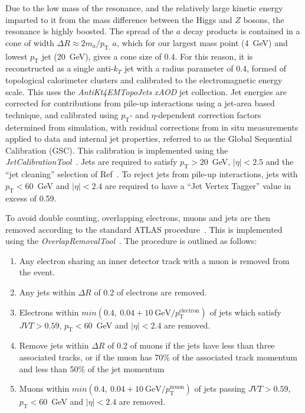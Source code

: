 \documentclass[NOTE, atlasdraft=true, texlive=2017, UKenglish]{\ATLASLATEXPATH atlasdoc}
\begin{document}
Due to the low mass of the resonance, and the relatively large kinetic energy imparted to it from the mass difference between the Higgs and $Z$ bosons, the resonance is highly boosted. The spread of the $a$ decay products is contained in a cone of width $\Delta R \approx 2 m_{a}/p_\text{T, }a$, which for our largest mass point (4~GeV) and lowest $p_\text{T}$ jet (20~GeV), gives a cone size of 0.4. For this reason, it is reconstructed as a single anti-$k_T$ jet with a radius parameter of 0.4, formed of topological calorimeter clusters and calibrated to the electromagnetic energy scale. This uses the \emph{AntiKt4EMTopoJets} \emph{xAOD} jet collection. Jet energies are corrected for contributions from pile-up interactions using a jet-area based technique, and calibrated using $p_\text{T}$- and $\eta$-dependent correction factors determined from simulation, with residual corrections from in situ measurements applied to data and internal jet properties, referred to as the Global Sequential Calibration (GSC). This calibration is implemented using the \emph{JetCalibrationTool}~\cite{JetCalibrationTool}. Jets are required to satisfy $p_\text{T}>20$~GeV, $\vert\eta\vert<2.5$ and the ``jet cleaning'' selection of Ref~\cite{ATLAS-CONF-2015-029}. To reject jets from pile-up interactions, jets with $p_\text{T}<60$~GeV and $\vert\eta\vert<2.4$ are required to have a ``Jet Vertex Tagger'' value in excess of 0.59.%


To avoid double counting, overlapping electrons, muons and jets are then removed according to the standard ATLAS procedure~\cite{Masubuchi:2235437}. This is implemented using the \emph{OverlapRemovalTool}~\cite{Adams:1743654}. The procedure is outlined as follows:
\begin{enumerate}
\item Any electron sharing an inner detector track with a muon is removed from the event.
\item Any jets within $\Delta R$ of 0.2 of electrons are removed.
\item Electrons within $min(0.4,\ 0.04 + 10\ \text{GeV}/p_\text{T}^\text{electron})$ of jets which satisfy $JVT > 0.59$, $p_\text{T}<60$~GeV and $\vert\eta\vert<2.4$ are removed.
\item Remove jets within $\Delta R$ of 0.2 of muons if the jets have less than three associated tracks, or if the muon has 70\% of the associated track momentum and less than 50\% of the jet momentum
\item Muons within $min(0.4,\ 0.04 + 10\ \text{GeV}/p_\text{T}^\text{muon})$ of jets passing $JVT > 0.59$, $p_\text{T}<60$~GeV and $\vert\eta\vert<2.4$ are removed.
\end{enumerate}
\end{document}
